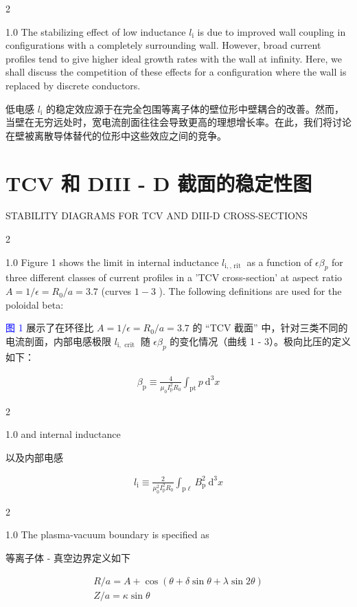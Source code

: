 \documentclass[utf8]{ctexart}
\newcommand\enzhbox[2]{
  	\quad\par \begin{paracol}{2} \colseprulecolor{black} 
  		\begin{spacing}{1.0}
  			\footnotesize  #1
  		\end{spacing}
  		\switchcolumn[1] 
  		#2
  	\end{paracol} \quad\par
  }
\begin{document}
\begin{sloppypar}
 
\enzhbox{  The stabilizing effect of low inductance $l_{\mathrm{i}}$ is due to improved wall coupling in configurations with a completely surrounding wall. However, broad current profiles tend to give higher ideal growth rates with the wall at infinity. Here, we shall discuss the competition of these effects for a configuration where the wall is replaced by discrete conductors.}{
低电感 $l_{\mathrm{i}}$ 的稳定效应源于在完全包围等离子体的壁位形中壁耦合的改善。然而，当壁在无穷远处时，宽电流剖面往往会导致更高的理想增长率。在此，我们将讨论在壁被离散导体替代的位形中这些效应之间的竞争。 }
  
 \section{TCV 和 DIII - D 截面的稳定性图}
 {  \small STABILITY DIAGRAMS FOR TCV AND DIII-D CROSS-SECTIONS \par }
 
\enzhbox{  Figure 1 shows the limit in internal inductance $l_{\mathrm{i}, \text {, rit }}$ as a function of $\epsilon \beta_{p}$ for three different classes of current profiles in a 'TCV cross-section' at aspect ratio $A=1 / \epsilon=R_{0} / a=3.7$ (curves $1-3$ ). The following definitions are used for the poloidal beta:}{
\textcolor{blue}{图 1} 展示了在环径比 $A = 1 / \epsilon=R_{0} / a = 3.7$ 的 “TCV 截面” 中，针对三类不同的电流剖面，内部电感极限 $l_{\mathrm{i}, \text { crit }}$ 随 $\epsilon \beta_{p}$ 的变化情况（曲线 1 - 3）。极向比压的定义如下：}
 \begin{align*}
 	 \beta_{\mathrm{p}} \equiv \frac{4}{\mu_{0} I_{\mathrm{p}}^{2} R_{0}} \int_{\mathrm{pt}} p \mathrm{~d}^{3} x
 \end{align*}
  
 
\enzhbox{  \noindent and internal inductance}{
\noindent 以及内部电感}
  \begin{align*}
  l_{\mathrm{i}} \equiv \frac{2}{\mu_{0}^{2} I_{\mathrm{p}}^{2} R_{0}} \int_{\mathrm{p} \ell} B_{\mathrm{p}}^{2} \mathrm{~d}^{3} x
  \end{align*}
  
 
\enzhbox{  The plasma-vacuum boundary is specified as}{
等离子体 - 真空边界定义如下}
  \begin{gather*}
  	R / a=A+\cos (\theta+\delta \sin \theta+\lambda \sin 2 \theta) \tag{1}\\
  Z / a=\kappa \sin \theta 
  \end{gather*}
  
  
 

\end{sloppypar}
\end{document}
